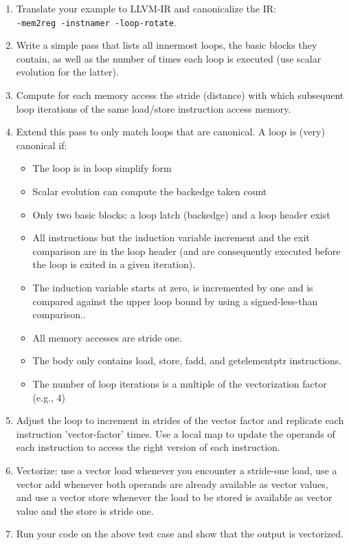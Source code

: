 \documentclass[12pt]{article}
\begin{document}
\begin{enumerate}
	\item Translate your example to LLVM-IR and canonicalize the IR:\\
              \texttt{-mem2reg -instnamer -loop-rotate}.
	\item Write a simple pass that lists all innermost loops, the basic
              blocks they contain, as well as the number of times each loop
              is executed (use scalar evolution for the latter).
	\item Compute for each memory access the stride (distance) with which
              subsequent loop iterations of the same load/store instruction
              access memory.
	\item Extend this pass to only match loops that are canonical. A loop
              is (very) canonical if:
	\begin{itemize}
		\item The loop is in loop simplify form
		\item Scalar evolution can compute the backedge taken count
		\item Only two basic blocks: a loop latch (backedge) and a loop
header exist
		\item All instructions but the induction variable increment and
		      the exit comparison are in the loop header (and are
		      consequently executed before the loop is exited in a
                      given iteration).
		\item The induction variable starts at zero, is incremented by
                      one and is compared against the upper loop bound by using
                      a signed-less-than comparison..
		\item All memory accesses are stride one.
		\item The body only contains load, store, fadd, and
                      getelementptr instructions.
		\item The number of loop iterations is a multiple of the
                      vectorization factor (e.g., 4)
	\end{itemize}
	\item Adjust the loop to increment in strides of the vector factor and
              replicate each instruction 'vector-factor' times. Use a local
              map to update the operands of each instruction to access the
              right version of each instruction.
	\item Vectorize: use a vector load whenever you encounter a stride-one
	      load, use a vector add whenever both operands are already
	      available as vector values, and use a vector store whenever
              the load to be stored is available as vector value and the store
              is stride one.
	\item Run your code on the above test case and show that the output
              is vectorized.
\end{enumerate}
\end{document}
